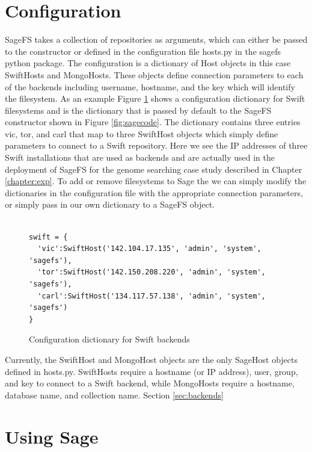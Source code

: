 \section{Configuration}

SageFS takes a collection of repositories as arguments, which can either be
passed to the constructor or defined in the configuration file hosts.py in the
sagefs python package. The configuration is a dictionary of Host objects in
this case SwiftHosts and MongoHosts. These objects define connection
parameters to each of the backends including username, hostname, and the key
which will identify the filesystem. As an example Figure \ref{fig:swiftconfig}
shows a configuration dictionary for Swift filesystems and is the dictionary
that is passed by default to the SageFS constructor shown in Figure
\ref{fig:sagecode}. The dictionary contains three entries vic, tor, and carl that
map to three SwiftHost objects which simply define parameters to connect to a
Swift repository. Here we see the IP addresses of three Swift installations
that are used as backends and are actually used in the deployment of SageFS
for the genome searching case study described in Chapter \ref{chapter:exp}. To
add or remove filesystems to Sage the we can simply modify the dictionaries in
the configuration file with the appropriate connection parameters, or simply
pass in our own dictionary to a SageFS object.


\begin{figure}[h]
\begin{lstlisting}

swift = {
  'vic':SwiftHost('142.104.17.135', 'admin', 'system', 'sagefs'),
  'tor':SwiftHost('142.150.208.220', 'admin', 'system', 'sagefs'),
  'carl':SwiftHost('134.117.57.138', 'admin', 'system', 'sagefs')
}

\end{lstlisting}
\caption{Configuration dictionary for Swift backends}
\label{fig:swiftconfig}
\end{figure}

Currently, the SwiftHost and MongoHost objects are the only SageHost objects
defined in hosts.py. SwiftHosts require a hostname (or IP address), user,
group, and key to connect to a Swift backend, while MongoHosts require a
hostname, database name, and collection name. Section \ref{sec:backends}


\section{Using Sage}

